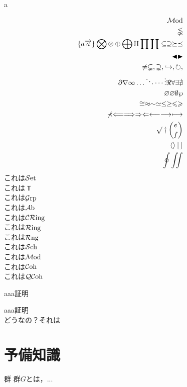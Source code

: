 \documentclass[a4paper,thmnumbering=section,eqnumbering=section]{summary-ja}
\begin{document}
a

\begin{align}
    \operatorname{\mathcal{M}\textrm{od}}\\
    \lnapprox\\
    \left\{a\overrightarrow{a} \right\} \bigotimes \otimes\oplus \bigoplus\amalg \prod \coprod \subseteq \supseteq \succeq \preceq \\
    \blacktriangleleft \blacktriangleright\\
    \neq \subsetneq, \supsetneq, \hookrightarrow, \circlearrowright, \\
    \partial \nabla \infty \ldots \ddots \cdots \vdots \Re \forall \exists \nexists\\
    \varnothing \varnothing \emptyset\wp\\
    \cong \approx \sim \simeq \leq \geq \leqslant \geqslant \\
    \nprec \Longleftarrow \Longrightarrow \Rightarrow \Leftarrow \longleftarrow \longrightarrow \longmapsto \\
    \surd \dagger \binom{e}{f} \\
    \left\langle \right\rangle \left\lfloor \right\rfloor \\
    \oint \iint 
\end{align}
\noindent
これは\(\mathcal{S}\textrm{et}\)\\
これは\(\Top\)\\
これは$\mathcal{G}\textrm{rp}$\\
これは$\mathcal{A}\textrm{b}$\\
これは$\mathcal{CR}\textrm{ing}$\\
これは$\mathcal{R}\textrm{ing}$\\
これは$\mathcal{R}\textrm{ng}$\\
これは$\mathcal{S}\textrm{ch}$\\
これは$\operatorname{\mathcal{M}\textrm{od}}$\\
これは$\operatorname{\mathcal{C}\textrm{oh}}$\\
これは$\operatorname{\mathcal{QC}\textrm{oh}}$


\begin{myproof}
    aaa証明
\end{myproof}
\begin{myproof}
    aaa証明\\
    どうなの？それは
\end{myproof}





\tableofcontents
\setcounter{section}{-1}

\newpage\section{予備知識}%
\begin{definition}{群}{}
    群$G$とは，...
\end{definition}
\end{document}
